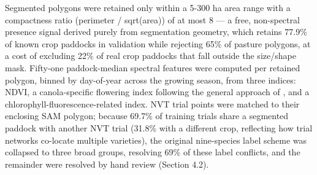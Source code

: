 Segmented polygons were retained only within a 5-300 ha area range with a compactness ratio (perimeter / sqrt(area)) of at most 8 --- a free, non-spectral presence signal derived purely from segmentation geometry, which retains 77.9\% of known crop paddocks in validation while rejecting 65\% of pasture polygons, at a cost of excluding 22\% of real crop paddocks that fall outside the size/shape mask. Fifty-one paddock-median spectral features were computed per retained polygon, binned by day-of-year across the growing season, from three indices: NDVI, a canola-specific flowering index following the general approach of \citet{ashourloo2019canola}, and a chlorophyll-fluorescence-related index. NVT trial points were matched to their enclosing SAM polygon; because 69.7\% of training trials share a segmented paddock with another NVT trial (31.8\% with a different crop, reflecting how trial networks co-locate multiple varieties), the original nine-species label scheme was collapsed to three broad groups, resolving 69\% of these label conflicts, and the remainder were resolved by hand review (Section 4.2).
